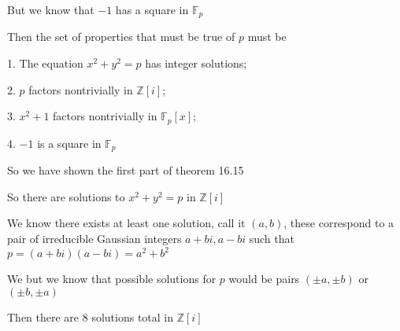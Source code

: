 \documentclass[12pt]{article}
\begin{document}
\begin{itemize}
But we know that $-1$ has a square in $\mathbb{F}_p$ 

Then the set of properties that must be true of $p$ must be

1. The equation $x^2 + y^2 = p$ has integer solutions;

2. $p$ factors nontrivially in $\mathbb{Z}[i]$;

3. $x^2 + 1$ factors nontrivially in $\mathbb{F}_p[x]$;

4. $-1$ is a square in $\mathbb{F}_p$

So we have shown the first part of theorem 16.15

So there are solutions to $x^2 + y^2 = p$ in $\mathbb{Z}[i]$

We know there exists at least one solution, call it $(a,b)$, these correspond to a pair of irreducible Gaussian integers $a + bi, a- bi$ such that $p = (a+bi)(a-bi) = a^2 + b^2$

We but we know that possible solutions for $p$ would be pairs $(\pm a, \pm b)$ or $(\pm b, \pm a)$ 

Then there are 8 solutions total in $\mathbb{Z}[i]$

\end{itemize}
\end{document}
